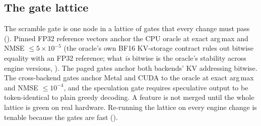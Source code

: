 \documentclass[sigconf,nonacm,screen]{acmart}
\begin{document}
\subsection{The gate lattice}
\label{sec:vpa-lattice}
The scramble gate is one node in a lattice of gates that every change must
pass (). Pinned FP32 reference vectors anchor the CPU
oracle at exact arg\,max and NMSE $\le 5\times10^{-5}$ (the oracle's own
BF16 KV-storage contract rules out bitwise equality with an FP32
reference; what \emph{is} bitwise is the oracle's stability across engine
versions, ). The paged gates anchor both backends' KV
addressing bitwise. The
cross-backend gates anchor Metal and CUDA to the oracle at exact arg\,max and
NMSE $\le 10^{-4}$, and the speculation gate requires speculative output to
be token-identical to plain greedy decoding. A feature is not merged until
the whole lattice is green on real hardware. Re-running the lattice on every
engine change is tenable because the gates are fast ().
\end{document}
